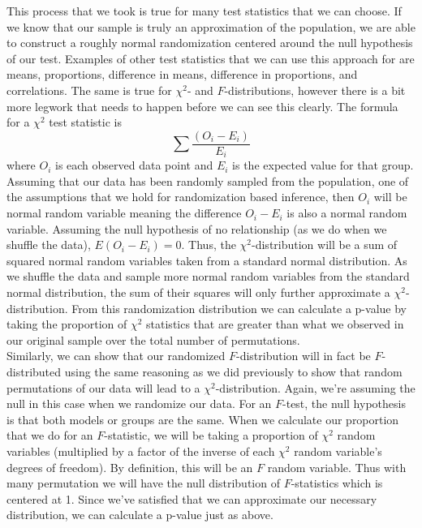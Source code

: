 This process that we took is true for many test statistics that we can choose. If we know that our sample is truly an approximation of the population, we are able to construct a roughly normal randomization centered around the null hypothesis of our test. Examples of other test statistics that we can use this approach for are means, proportions, difference in means, difference in proportions, and correlations. The same is true for $\chi^2$- and $F$-distributions, however there is a bit more legwork that needs to happen before we can see this clearly. The formula for a $\chi^2$ test statistic is $$\sum\frac{(O_i-E_i)}{E_i}$$ where $O_i$ is each observed data point and $E_i$ is the expected value for that group. Assuming that our data has been randomly sampled from the population, one of the assumptions that we hold for randomization based inference, then $O_i$ will be normal random variable meaning the difference $O_i-E_i$ is also a normal random variable. Assuming the null hypothesis  of no relationship (as we do when we shuffle the data), $E(O_i-E_i)=0$. Thus, the $\chi^2$-distribution will be a sum of squared normal random variables taken from a standard normal distribution. As we shuffle the data and  sample more normal random variables from the standard normal distribution, the sum of their squares will only further approximate a $\chi^2$-distribution. From this randomization distribution we can calculate a p-value by taking the proportion of $\chi^2$ statistics that are greater than what we observed in our original sample over the total number of permutations. 
\newline\\
Similarly, we can show that our randomized $F$-distribution will in fact be $F$-distributed using the same reasoning as we did previously to show that random permutations of our data will lead to a $\chi^2$-distribution. Again, we're assuming the null in this case when we randomize our data. For an $F$-test, the null hypothesis is that both models or groups are the same. When we calculate our proportion that we do for an $F$-statistic, we will be taking a proportion of $\chi^2$ random variables (multiplied by a factor of the inverse of each $\chi^2$ random variable's degrees of freedom). By definition, this will be an $F$ random variable. Thus with many permutation we will have the null distribution of $F$-statistics which is centered at 1. Since we've satisfied that we can approximate our necessary distribution, we can calculate a p-value just as above. 